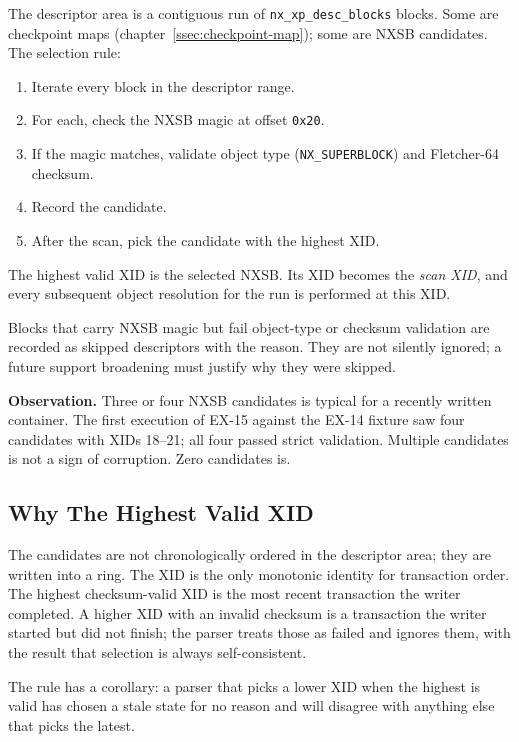 The descriptor area is a contiguous run of \texttt{nx\_xp\_desc\_blocks}
blocks. Some are checkpoint maps (chapter~\ref{ssec:checkpoint-map});
some are NXSB candidates. The selection rule:

\begin{enumerate}
  \item Iterate every block in the descriptor range.
  \item For each, check the NXSB magic at offset \texttt{0x20}.
  \item If the magic matches, validate object type
    (\texttt{NX\_SUPERBLOCK}) and Fletcher-64 checksum.
  \item Record the candidate.
  \item After the scan, pick the candidate with the highest XID.
\end{enumerate}

The highest valid XID is the selected NXSB. Its XID becomes the
\emph{scan XID}, and every subsequent object resolution for the run is
performed at this XID.

Blocks that carry NXSB magic but fail object-type or checksum
validation are recorded as skipped descriptors with the reason. They
are not silently ignored; a future support broadening must justify
why they were skipped.

\textbf{Observation.} Three or four NXSB candidates is typical for a
recently written container. The first execution of EX-15 against the
EX-14 fixture saw four candidates with XIDs 18--21; all four passed
strict validation. Multiple candidates is not a sign of corruption.
Zero candidates is.

\subsection{Why The Highest Valid XID}

The candidates are not chronologically ordered in the descriptor area;
they are written into a ring. The XID is the only monotonic identity
for transaction order. The highest checksum-valid XID is the most
recent transaction the writer completed. A higher XID with an invalid
checksum is a transaction the writer started but did not finish; the
parser treats those as failed and ignores them, with the result that
selection is always self-consistent.

The rule has a corollary: a parser that picks a lower XID when the
highest is valid has chosen a stale state for no reason and will
disagree with anything else that picks the latest.

